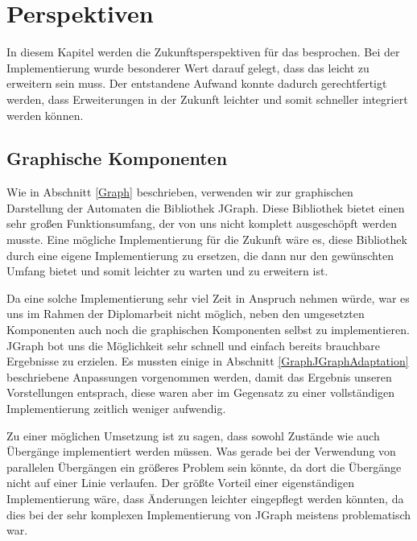 



\chapter{Perspektiven}\label{Perspective}

In diesem Kapitel werden die Zukunftsperspektiven für das \gtitool besprochen.
Bei der Implementierung wurde besonderer Wert darauf gelegt, dass das \gtitool
leicht zu erweitern sein muss. Der entstandene Aufwand konnte dadurch
gerechtfertigt werden, dass Erweiterungen in der Zukunft leichter und somit
schneller integriert werden können.\vspace{10pt}


\section{Graphische Komponenten}\label{PerspectiveGraphics}

Wie in Abschnitt \ref{Graph} beschrieben, verwenden wir zur graphischen
Darstellung der Automaten die Bibliothek JGraph. Diese Bibliothek bietet einen
sehr großen Funktionsumfang, der von uns nicht komplett ausgeschöpft werden
musste. Eine mögliche Implementierung für die Zukunft wäre es, diese Bibliothek
durch eine eigene Implementierung zu ersetzen, die dann nur den gewünschten
Umfang bietet und somit leichter zu warten und zu erweitern ist.\vspace{10pt}

Da eine solche Implementierung sehr viel Zeit in Anspruch nehmen würde, war es
uns im Rahmen der Diplomarbeit nicht möglich, neben den umgesetzten Komponenten
auch noch die graphischen Komponenten selbst zu implementieren. JGraph bot uns
die Möglichkeit sehr schnell und einfach bereits brauchbare Ergebnisse zu
erzielen. Es mussten einige in Abschnitt \ref{GraphJGraphAdaptation} beschriebene
Anpassungen vorgenommen werden, damit das Ergebnis unseren Vorstellungen
entsprach, diese waren aber im Gegensatz zu einer vollständigen Implementierung
zeitlich weniger aufwendig.\vspace{10pt}

Zu einer möglichen Umsetzung ist zu sagen, dass sowohl Zustände wie auch
Übergänge implementiert werden müssen. Was gerade bei der Verwendung von
parallelen Übergängen ein größeres Problem sein könnte, da dort die Übergänge
nicht auf einer Linie verlaufen. Der größte Vorteil einer eigenständigen
Implementierung wäre, dass Änderungen leichter eingepflegt werden könnten, da
dies bei der sehr komplexen Implementierung von JGraph meistens problematisch
war.\vspace{10pt}

